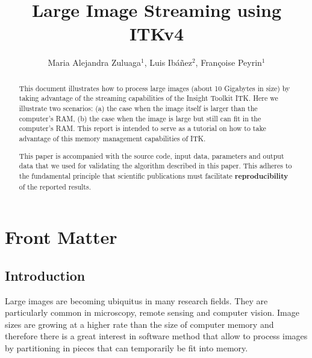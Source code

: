 \documentclass{InsightArticle}
\title{Large Image Streaming using ITKv4}
\author{Maria Alejandra Zuluaga$^{1}$, Luis Ib\'{a}\~{n}ez$^{2}$, Fran\c{c}oise Peyrin$^{1}$}
\newcommand{\IJhandlerIDnumber}{3063}
\begin{document}
%
%
\IJhandlefooter{\IJhandlerIDnumber}


\ifpdf
\else
\fi


\maketitle


\ifhtml
\chapter*{Front Matter\label{front}}
\fi


\begin{abstract}
\noindent
This document illustrates how to process large images (about 10 Gigabytes in
size) by taking advantage of the streaming capabilities of the Insight Toolkit
ITK.  Here we illustrate two scenarios: (a) the case when the image itself is
larger than the computer's RAM, (b) the case when the image is large but still
can fit in the computer's RAM. This report is intended to serve as a tutorial
on how to take advantage of this memory management capabilities of ITK.

This paper is accompanied with the source code, input data, parameters and
output data that we used for validating the algorithm described in this paper.
This adheres to the fundamental principle that scientific publications must
facilitate \textbf{reproducibility} of the reported results.
\end{abstract}

\tableofcontents

\section{Introduction}

Large images are becoming ubiquitus in many research fields. They are
particularly common in microscopy, remote sensing and computer vision.  Image
sizes are growing at a higher rate than the size of computer memory and
therefore there is a great interest in software method that allow to process
images by partitioning in pieces that can temporarily be fit into memory.
\end{document}
